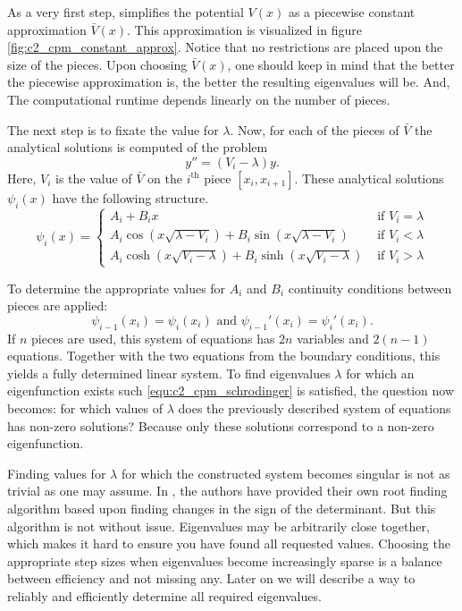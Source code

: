As a very first step, \cite{canosa_new_1970} simplifies the potential $V(x)$ as a piecewise constant approximation $\bar{V}(x)$. This approximation is visualized in figure \ref{fig:c2_cpm_constant_approx}. Notice that no restrictions are placed upon the size of the pieces. Upon choosing $\bar{V}(x)$, one should keep in mind that the better the piecewise approximation is, the better the resulting eigenvalues will be. And, The computational runtime depends linearly on the number of pieces.

The next step is to fixate the value for $\lambda$. Now, for each of the pieces of $\bar{V}$ the analytical solutions is computed of the problem
$$
    y'' = (V_i - \lambda) y\text{.}
$$
Here, $V_i$ is the value of $\bar{V}$ on the $i^\text{th}$ piece $[x_i, x_{i+1}]$. These analytical solutions $\psi_i(x)$ have the following structure.
$$
    \psi_i(x) = \begin{cases}
        A_i + B_i x                                                         & \text{ if $V_i = \lambda$} \\
        A_i \cos(x\sqrt{\lambda - V_i}) + B_i \sin(x\sqrt{\lambda - V_i})   & \text{ if $V_i < \lambda$} \\
        A_i \cosh(x\sqrt{V_i - \lambda}) + B_i \sinh(x\sqrt{V_i - \lambda}) & \text{ if $V_i > \lambda$}
    \end{cases}
$$

To determine the appropriate values for $A_i$ and $B_i$ continuity conditions between pieces are applied:
$$
    \psi_{i-1}(x_i) = \psi_{i}(x_i) \text{ and } \psi_{i-1}'(x_i) = \psi_{i}'(x_i) \text{.}
$$
If $n$ pieces are used, this system of equations has $2n$ variables and $2(n-1)$ equations. Together with the two equations from the boundary conditions, this yields a fully determined linear system. To find eigenvalues $\lambda$ for which an eigenfunction exists such \eqref{equ:c2_cpm_schrodinger} is satisfied, the question now becomes: for which values of $\lambda$ does the previously described system of equations has non-zero solutions? Because only these solutions correspond to a non-zero eigenfunction.

Finding values for $\lambda$ for which the constructed system becomes singular is not as trivial as one may assume. In \cite{canosa_new_1970}, the authors have provided their own root finding algorithm based upon finding changes in the sign of the determinant. But this algorithm is not without issue. Eigenvalues may be arbitrarily close together, which makes it hard to ensure you have found all requested values. Choosing the appropriate step sizes when eigenvalues become increasingly sparse is a balance between efficiency and not missing any. Later on we will describe a way to reliably and efficiently determine all required eigenvalues.

